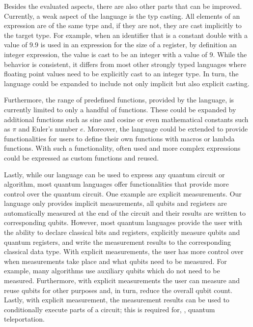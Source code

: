Besides the evaluated aspects, there are also other parts that can be improved. Currently, a weak aspect of the language is the typ casting. All elements of an expression are of the same type and, if they are not, they are cast implicitly to the target type. For example, when an identifier that is a constant double with a value of $9.9$ is used in an expression for the size of a register, by definition an integer expression, the value is cast to be an integer with a value of $9$. While the behavior is consistent, it differs from most other strongly typed languages where floating point values need to be explicitly cast to an integer type. In turn, the language could be expanded to include not only implicit but also explicit casting.     

Furthermore, the range of predefined functions, provided by the language, is currently limited to only a handful of functions. These could be expanded by additional functions such as sine and cosine or even mathematical constants such as $\pi$ and Euler's number $e$. Moreover, the language could be extended to provide functionalities for users to define their own functions with macros or lambda functions. With such a functionality, often used and more complex expressions could be expressed as custom functions and reused.

Lastly, while our language can be used to express any quantum circuit or algorithm, most quantum languages offer functionalities that provide more control over the quantum circuit. One example are explicit measurements. Our language only provides implicit measurements, \ie all qubits and registers are automatically measured at the end of the circuit and their results are written to corresponding qubits. However, most quantum languages provide the user with the ability to declare classical bits and registers, explicitly measure qubits and quantum registers, and write the measurement results to the corresponding classical data type. With explicit measurements, the user has more control over when measurements take place and what qubits need to be measured. For example, many algorithms use auxiliary qubits which do not need to be measured. Furthermore, with explicit measurements the user can measure and reuse qubits for other purposes and, in turn, reduce the overall qubit count. Lastly, with explicit measurement, the measurement results can be used to conditionally execute parts of a circuit; this is required for, \eg, quantum teleportation.
